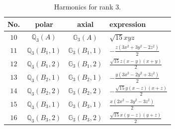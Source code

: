 \documentclass[fleqn,8pt,landscape]{jsarticle}
\begin{document}
\begin{table}[ht!]
\begin{center}
\caption{Harmonics for rank 3.}
\renewcommand{\arraystretch}{1.3}
\begin{tabular}{cccl} \hline \hline
No. & polar & axial & expression \\ \hline
$ 10 $ & $ \mathbb{Q}_{3}(A) $ & $ \mathbb{G}_{3}(A) $ & $ \sqrt{15} x y z $ \\
$ 11 $ & $ \mathbb{Q}_{3}(B_{1},1) $ & $ \mathbb{G}_{3}(B_{1},1) $ & $ - \frac{z \left(3 x^{2} + 3 y^{2} - 2 z^{2}\right)}{2} $ \\
$ 12 $ & $ \mathbb{Q}_{3}(B_{1},2) $ & $ \mathbb{G}_{3}(B_{1},2) $ & $ \frac{\sqrt{15} z \left(x - y\right) \left(x + y\right)}{2} $ \\
$ 13 $ & $ \mathbb{Q}_{3}(B_{2},1) $ & $ \mathbb{G}_{3}(B_{2},1) $ & $ - \frac{y \left(3 x^{2} - 2 y^{2} + 3 z^{2}\right)}{2} $ \\
$ 14 $ & $ \mathbb{Q}_{3}(B_{2},2) $ & $ \mathbb{G}_{3}(B_{2},2) $ & $ - \frac{\sqrt{15} y \left(x - z\right) \left(x + z\right)}{2} $ \\
$ 15 $ & $ \mathbb{Q}_{3}(B_{3},1) $ & $ \mathbb{G}_{3}(B_{3},1) $ & $ \frac{x \left(2 x^{2} - 3 y^{2} - 3 z^{2}\right)}{2} $ \\
$ 16 $ & $ \mathbb{Q}_{3}(B_{3},2) $ & $ \mathbb{G}_{3}(B_{3},2) $ & $ \frac{\sqrt{15} x \left(y - z\right) \left(y + z\right)}{2} $ \\
 \hline \hline
\end{tabular}
\end{center}
\end{table}
\end{document}
